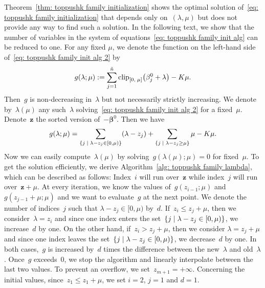 Theorem~\ref{thm: toppushk family initialization} shows the optimal solution of~\eqref{eq: toppushk family initialization} that depends only on~$(\lambda, \mu)$ but does not provide any way to find such a solution. In the following text, we show that the number of variables in the system of equations~\eqref{eq: toppushk family init alg} can be reduced to one. For any fixed $\mu$, we denote the function on the left-hand side of~\eqref{eq: toppushk family init alg 2} by 
\begin{equation*}
  g(\lambda; \mu) := \sum_{j=1}^{\ntil} \clip{0}{\mu}{\beta_j^0 + \lambda} - K\mu.
\end{equation*}
Then~$g$ is non-decreasing in~$\lambda$ but not necessarily strictly increasing. We denote by~$\lambda(\mu)$ any such~$\lambda$ solving~\eqref{eq: toppushk family init alg 2} for a fixed~$\mu$. Denote~$\bm{z}$ the sorted version of~$-\bm{\beta}^0$. Then we have
\begin{equation*}
  g(\lambda; \mu)
    = \sum_{\Set{j}{\lambda - z_j \in [0, \mu)}}(\lambda - z_j)
    + \sum_{\Set{j}{\lambda - z_j \ge \mu}}\mu - K\mu.
\end{equation*}
Now we can easily compute~$\lambda(\mu)$ by solving~$g(\lambda(\mu); \mu) = 0$ for fixed~$\mu.$ To get the solution efficiently, we derive Algorithm~\ref{alg: toppushk family lambda}, which can  be described as follows: Index~$i$ will run over~$\bm{z}$ while index~$j$ will run over~$\bm{z} + \mu$. At every iteration, we know the values of~$g(z_{i-1}; \mu)$ and~$g(z_{j-1}+\mu; \mu)$ and we want to evaluate~$g$ at the next point. We denote the number of indices~$j$ such that $\lambda - z_j \in[0, \mu)$ by~$d$. If~$z_i \le z_j + \mu$, then we consider~$\lambda = z_i$ and since one index enters the set~$\Set{j}{\lambda - z_j \in [0, \mu)}$, we increase~$d$ by one. On the other hand, if~$z_i > z_j + \mu$, then we consider $\lambda = z_j + \mu$ and since one index leaves the set~$\Set{j}{\lambda - z_j \in [0, \mu)}$, we decrease~$d$ by one. In both cases,~$g$ is increased by~$d$ times the difference between the new~$\lambda$ and old~$\lambda$. Once~$g$ exceeds~$0$, we stop the algorithm and linearly interpolate between the last two values. To prevent an overflow, we set~$z_{m+1} = + \infty$. Concerning the initial values, since~$z_1 \le z_1 + \mu$, we set $i=2$, $j=1$ and $d=1$. 

